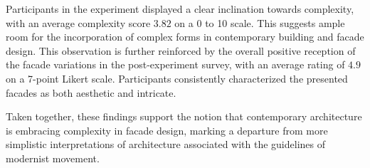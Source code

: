 Participants in the experiment displayed a clear inclination towards complexity, with an average complexity score \(3.82\) on a 0 to 10 scale.
This suggests ample room for the incorporation of complex forms in contemporary building and facade design.
This observation is further reinforced by the overall positive reception of the facade variations in the post-experiment survey, with an average rating of \(4.9\) on a 7-point Likert scale.
Participants consistently characterized the presented facades as both aesthetic and intricate.

Taken together, these findings support the notion that contemporary architecture is embracing complexity in facade design, marking a departure from more simplistic interpretations of architecture associated with the guidelines of modernist movement.



